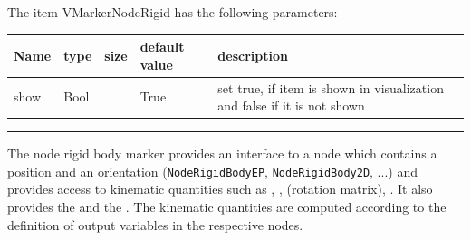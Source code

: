 \noindent The item VMarkerNodeRigid has the following parameters:
\begin{center}
  \footnotesize
  \begin{longtable}{| p{4.5cm} | p{2.5cm} | p{0.5cm} | p{2.5cm} | p{6cm} |}
    \hline
    \bf Name & \bf type & \bf size & \bf default value & \bf description \\ \hline
    show &     Bool &      &     True &     set true, if item is shown in visualization and false if it is not shown\\ \hline
\end{longtable}
\end{center}
\par\noindent\rule{\textwidth}{0.4pt}
\label{description_MarkerNodeRigid}
 \noindent
    The node rigid body marker provides an interface to a node which contains a position and an orientation
    (\texttt{NodeRigidBodyEP}, \texttt{NodeRigidBody2D}, ...)
    and provides access to kinematic quantities such as , ,  (rotation matrix),
    . It also provides the  and the .
    The kinematic quantities are computed according to the definition of output variables in the respective nodes.
    
